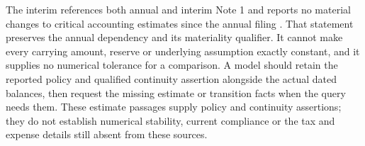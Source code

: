 The interim references both annual and interim Note 1 and reports no material
changes to critical accounting estimates since the annual filing
\citep[Critical Accounting Estimates, printed p.~17]{apple2025q1}.
That statement preserves the annual dependency and its materiality qualifier.
It cannot make every carrying amount, reserve or underlying assumption exactly
constant, and it supplies no numerical tolerance for a comparison. A model
should retain the reported policy and qualified continuity assertion alongside
the actual dated balances, then request the missing estimate or transition
facts when the query needs them. These estimate passages supply policy and
continuity assertions; they do not establish numerical stability, current
compliance or the tax and expense details still absent from these sources.
